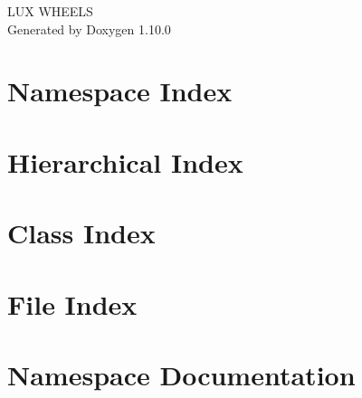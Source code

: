 \documentclass[twoside]{book}
\newcommand{\+}{\discretionary{\mbox{\scriptsize$\hookleftarrow$}}{}{}}
\newcommand{\clearemptydoublepage}{%
    \newpage{\pagestyle{empty}\cleardoublepage}%
  }
\begin{document}
  \raggedbottom
    \hypersetup{pageanchor=false,
                bookmarksnumbered=true,
                pdfencoding=unicode
               }
  \begin{titlepage}
  \vspace*{7cm}
  \begin{center}%
  {\Large LUX WHEELS}\\
  \vspace*{1cm}
  {\large Generated by Doxygen 1.10.0}\\
  \end{center}
  \end{titlepage}
  \clearemptydoublepage
  \tableofcontents
  \clearemptydoublepage
  \hypersetup{pageanchor=true}

\chapter{Namespace Index}

\chapter{Hierarchical Index}

\chapter{Class Index}

\chapter{File Index}

\chapter{Namespace Documentation}













\end{document}
